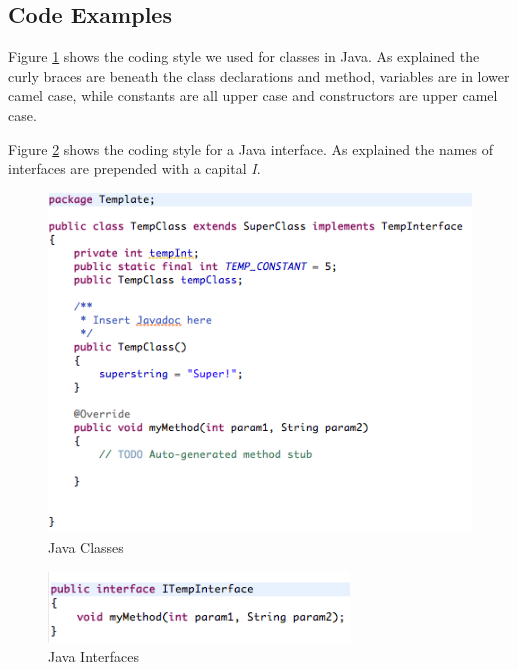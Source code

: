 \subsection{Code Examples}
Figure \ref{fig:javaClassesTempl} shows the coding style we used for
classes in Java. As explained the curly braces are beneath the class
declarations and method, variables are in lower camel case, while
constants are all upper case and constructors are upper camel case. 

Figure \ref{fig:javaInterfacesTempl} shows the coding style for a 
Java interface. As explained the names of interfaces are prepended
with a capital \emph{I}.

\begin{figure}[h]
	\begin{center}
		\includegraphics[width=12cm]{Pictures/CodeTemplate1}
	\end{center}
	\caption{Java Classes}
	\label{fig:javaClassesTempl}
\end{figure}

\begin{figure}[h]
	\begin{center}
		\includegraphics[width=8cm]{Pictures/CodeTemplate2}
	\end{center}
	\caption{Java Interfaces}
	\label{fig:javaInterfacesTempl}
\end{figure}
